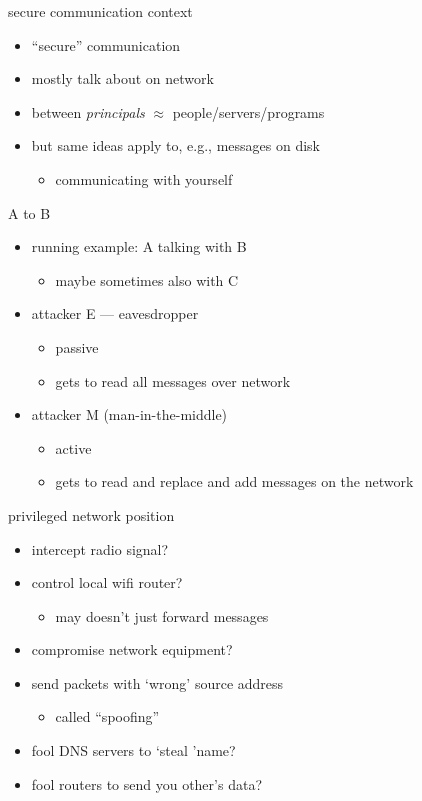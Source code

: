 \begin{frame}{secure communication context}
    \begin{itemize}
    \item ``secure'' communication
    \item mostly talk about on network
    \item between \textit{principals} $\approx$ people/servers/programs
    \vspace{.5cm}
    \item but same ideas apply to, e.g., messages on disk
        \begin{itemize}
        \item communicating with yourself
        \end{itemize}
    \end{itemize}
\end{frame}

\begin{frame}{A to B}
    \begin{itemize}
    \item running example: A talking with B
        \begin{itemize}
        \item maybe sometimes also with C
        \end{itemize}
    \item attacker E --- eavesdropper
        \begin{itemize}
        \item passive
        \item gets to read all messages over network
        \end{itemize}
    \item attacker M (man-in-the-middle)
        \begin{itemize}
        \item active
        \item gets to read and replace and add messages on the network
        \end{itemize}
    \end{itemize}
\end{frame}

\begin{frame}{privileged network position}
    \begin{itemize}
    \item intercept radio signal?
    \item control local wifi router?
        \begin{itemize}
        \item may doesn't just forward messages
        \end{itemize}
    \item compromise network equipment?
    \item send packets with `wrong' source address
        \begin{itemize}
        \item called ``spoofing''
        \end{itemize}
    \item fool DNS servers to `steal 'name?
    \item fool routers to send you other's data?
    \end{itemize}
\end{frame}
